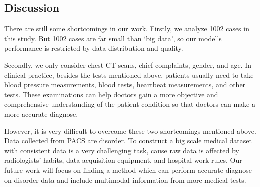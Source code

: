 \subsection{Discussion}
There are still some shortcomings in our work.
Firstly, we analyze 1002 cases in this study. But 1002 cases are far small than `big data', so our model's performance is restricted by data distribution and quality. 

Secondly, we only consider chest CT scans, chief complaints, gender, and age. In clinical practice, besides the tests mentioned above, patients usually need to take blood pressure measurements, blood tests, heartbeat measurements, and other tests. These examinations can help doctors gain a more objective and comprehensive understanding of the patient condition so that doctors can make a more accurate diagnose.

However, it is very difficult to overcome these two shortcomings mentioned above. Data collected from PACS are disorder. To construct a big scale medical dataset with consistent data is a very challenging task, cause raw data is affected by radiologists' habits, data acquisition equipment, and hospital work rules. 
Our future work will focus on finding a method which can perform accurate diagnose on disorder data and include multimodal information from more medical tests.